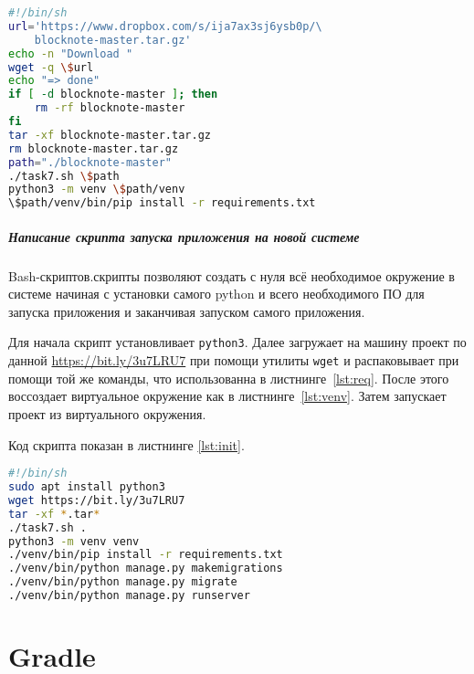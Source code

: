 \begin{lstlisting}[language=Bash
	, caption=\leftline{Создание виртуального окружения}
	, label=lst:venv]
#!/bin/sh
url='https://www.dropbox.com/s/ija7ax3sj6ysb0p/\
	blocknote-master.tar.gz'
echo -n "Download "
wget -q \$url
echo "=> done"
if [ -d blocknote-master ]; then
	rm -rf blocknote-master
fi
tar -xf blocknote-master.tar.gz
rm blocknote-master.tar.gz
path="./blocknote-master"
./task7.sh \$path
python3 -m venv \$path/venv
\$path/venv/bin/pip install -r requirements.txt
\end{lstlisting}

\paragraph{Написание скрипта запуска приложения на новой системе}\mbox{}\par
Bash-скриптов.скрипты позволяют создать с нуля всё необходимое окружение в
системе начиная с установки самого python и всего необходимого ПО для
запуска приложения и заканчивая запуском самого приложения.\par
Для начала скрипт установливает \texttt{python3}.
Далее загружает на машину проект по данной \url{https://bit.ly/3u7LRU7}
при помощи утилиты \texttt{wget} и распаковывает при помощи той же команды,
что использованна в листнинге~\ref{lst:req}.
После этого воссоздает виртуальное окружение как в листнинге~\ref{lst:venv}.
Затем запускает проект из виртуального окружения.\par
Код скрипта показан в листнинге \ref{lst:init}.

\begin{lstlisting}[language=Bash
	, caption=\leftline{Создание стартового скрипта}
	, label=lst:init]
#!/bin/sh
sudo apt install python3
wget https://bit.ly/3u7LRU7
tar -xf *.tar*
./task7.sh .
python3 -m venv venv
./venv/bin/pip install -r requirements.txt
./venv/bin/python manage.py makemigrations
./venv/bin/python manage.py migrate
./venv/bin/python manage.py runserver
\end{lstlisting}

\chapter{Gradle}

